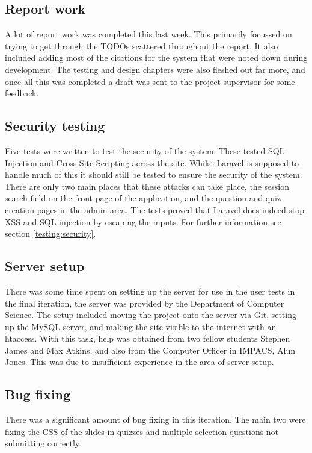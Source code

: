 \subsection{Report work}
A lot of report work was completed this last week. This primarily focussed on trying to get through the TODOs scattered throughout the report. It also included adding most of the citations for the system that were noted down during development. The testing and design chapters were also fleshed out far more, and once all this was completed a draft was sent to the project supervisor for some feedback.

\subsection{Security testing}
Five tests were written to test the security of the system. These tested SQL Injection and Cross Site Scripting across the site. Whilst Laravel is supposed to handle much of this it should still be tested to ensure the security of the system. There are only two main places that these attacks can take place, the session search field on the front page of the application, and the question and quiz creation pages in the admin area. The tests proved that Laravel does indeed stop XSS and SQL injection by escaping the inputs. For further information see section \ref{testing:security}.

\subsection{Server setup}
There was some time spent on setting up the server for use in the user tests in the final iteration, the server was provided by the Department of Computer Science. The setup included moving the project onto the server via Git, setting up the MySQL server, and making the site visible to the internet with an htaccess. With this task, help was obtained from two fellow students Stephen James and Max Atkins, and also from the Computer Officer in IMPACS, Alun Jones. This was due to insufficient experience in the area of server setup.

\subsection{Bug fixing}
There was a significant amount of bug fixing in this iteration. The main two were fixing the CSS of the slides in quizzes and multiple selection questions not submitting correctly. 

